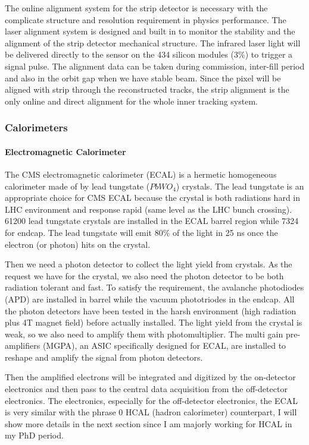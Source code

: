 The online alignment system\cite{Sirunyan:2017rbc} for the strip detector is necessary with the complicate structure and resolution requirement in physics performance. The laser alignment system is designed and built in to monitor the stability and the alignment of the strip detector mechanical structure. The infrared laser light will be delivered directly to the sensor on the 434 silicon modules (3\%) to trigger a signal pulse. The alignment data can be taken during commission, inter-fill period and also in the orbit gap when we have stable beam. Since the pixel will be aligned with strip through the reconstructed tracks, the strip alignment is the only online and direct alignment for the whole inner tracking system. 


\subsubsection{Calorimeters}
\paragraph{Electromagnetic Calorimeter}
The CMS electromagnetic calorimeter (ECAL) is a hermetic homogeneous calorimeter made of by lead tungstate ($PbWO_{4}$) crystals. The lead tungstate is an appropriate choice for CMS ECAL because the crystal is both radiations hard in LHC environment and response rapid (same level as the LHC bunch crossing). 61200 lead tungstate crystals are installed in the ECAL barrel region while 7324 for endcap. The lead tungstate will emit 80\% of the light in 25 ns once the electron (or photon) hits on the crystal.

Then we need a photon detector to collect the light yield from crystals. As the request we have for the crystal, we also need the photon detector to be both radiation tolerant and fast. To satisfy the requirement, the avalanche photodiodes (APD) are installed in barrel while the vacuum phototriodes in the endcap. All the photon detectors have been tested in the harsh environment (high radiation plus 4T magnet field) before actually installed. The light yield from the crystal is weak, so we also need to amplify them with photomultiplier. The multi gain pre-amplifiers (MGPA), an ASIC specifically designed for ECAL, are installed to reshape and amplify the signal from photon detectors.

Then the amplified electrons will be integrated and digitized by the on-detector electronics and then pass to the central data acquisition from the off-detector electronics. The electronics, especially for the off-detector electronics, the ECAL is very similar with the phrase 0 HCAL (hadron calorimeter) counterpart, I will show more details in the next section since I am majorly working for HCAL in my PhD period. 

